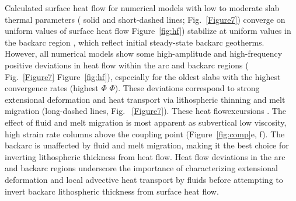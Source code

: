 \documentclass[draft,linenumbers]{agujournal2018} %
\providecommand{\DIFaddtex}[1]{{\protect\color{blue} \sf #1}} %
\providecommand{\DIFdeltex}[1]{{\protect\color{red} \scriptsize #1}} %
\providecommand{\DIFaddbegin}{} %
\providecommand{\DIFaddend}{} %
\providecommand{\DIFdelbegin}{} %
\providecommand{\DIFdelend}{} %
\providecommand{\DIFadd}[1]{\texorpdfstring{\DIFaddtex{#1}}{#1}} %
\providecommand{\DIFdel}[1]{\texorpdfstring{\DIFdeltex{#1}}{}} %
\newcommand{\DIFscaledelfig}{0.3}
\newlength{\DIFdelgraphicswidth} %
\newlength{\DIFdelgraphicsheight} %
\newcommand{\DIFaddincludegraphics}[2][]{{\color{blue}\fbox{\DIFOincludegraphics[#1]{#2}}}} %
\newcommand{\DIFdelincludegraphics}[2][]{%
\sbox{\DIFdelgraphicsbox}{\DIFOincludegraphics[#1]{#2}}%
\settoboxwidth{\DIFdelgraphicswidth}{\DIFdelgraphicsbox} %
\settoboxtotalheight{\DIFdelgraphicsheight}{\DIFdelgraphicsbox} %
\scalebox{\DIFscaledelfig}{%
\parbox[b]{\DIFdelgraphicswidth}{\usebox{\DIFdelgraphicsbox}\\[-\baselineskip] \rule{\DIFdelgraphicswidth}{0em}}\llap{\resizebox{\DIFdelgraphicswidth}{\DIFdelgraphicsheight}{%
\setlength{\unitlength}{\DIFdelgraphicswidth}%
\begin{picture}(1,1)%
\thicklines\linethickness{2pt} %
{\color[rgb]{1,0,0}\put(0,0){\framebox(1,1){}}}%
{\color[rgb]{1,0,0}\put(0,0){\line( 1,1){1}}}%
{\color[rgb]{1,0,0}\put(0,1){\line(1,-1){1}}}%
\end{picture}%
}\hspace*{3pt}}} %
} %
\DeclareRobustCommand{\DIFaddbegin}{\DIFOaddbegin \let\includegraphics\DIFaddincludegraphics} %
\DeclareRobustCommand{\DIFaddend}{\DIFOaddend \let\includegraphics\DIFOincludegraphics} %
\DeclareRobustCommand{\DIFdelbegin}{\DIFOdelbegin \let\includegraphics\DIFdelincludegraphics} %
\DeclareRobustCommand{\DIFdelend}{\DIFOaddend \let\includegraphics\DIFOincludegraphics} %
\begin{document}
\DIFaddend Calculated surface heat flow for numerical models with low to moderate
slab thermal parameters (\DIFdelbegin \DIFdel{solid and short-dashed lines; Fig.~\ref{Figure7}) converge on uniform
values of surface heat flow }\DIFdelend \DIFaddbegin \DIFadd{Figure~\ref{fig:hf}) stabilize at uniform
values }\DIFaddend in the backarc region\DIFaddbegin \DIFadd{, which reflect initial steady-state backarc
geotherms}\DIFaddend . However, all numerical models show some high-amplitude and
high-frequency positive deviations in heat flow within the arc and
backarc regions (\DIFdelbegin \DIFdel{Fig.~\ref{Figure7}}\DIFdelend \DIFaddbegin \DIFadd{Figure~\ref{fig:hf}}\DIFaddend ), especially for the oldest slabs
with the highest convergence rates (highest \DIFdelbegin \DIFdel{$\Phi$}\DIFdelend \DIFaddbegin \DIFadd{\(\Phi\)}\DIFaddend ). These deviations
correspond to strong extensional deformation and heat transport via
lithospheric thinning and melt migration\DIFdelbegin \DIFdel{(long-dashed lines, Fig. ~\ref{Figure7}). These heat flowexcursions }\DIFdelend \DIFaddbegin \DIFadd{. The effect of fluid and melt
migration is most apparent as subvertical low viscosity, high strain
rate columns above the coupling point (Figure~\ref{fig:comp}e, f). The
backarc is unaffected by fluid and melt migration, making it the best
choice for inverting lithospheric thickness from heat flow. Heat flow
deviations in the arc and backarc regions }\DIFaddend underscore the importance of
characterizing extensional deformation and local advective heat
transport by fluids before attempting to invert backarc lithospheric
thickness from surface heat flow.

\DIFdelbegin %
\end{document}
